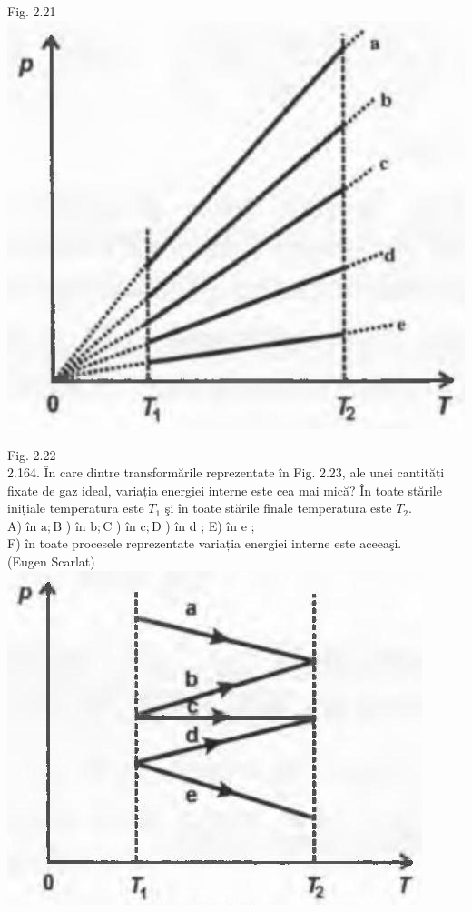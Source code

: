 \documentclass[10pt]{article}
\begin{document}
Fig. 2.21\\
\includegraphics[max width=\textwidth, center]{2025_07_01_5b3ff9fa0d508c8e9f17g-110(2)}

Fig. 2.22\\
2.164. În care dintre transformările reprezentate în Fig. 2.23, ale unei cantități fixate de gaz ideal, variația energiei interne este cea mai mică? În toate stările inițiale temperatura este $T_{1}$ şi în toate stările finale temperatura este $T_{2}$.\\
A) în $\mathrm{a} ; \mathrm{B}$ ) în $\mathrm{b} ; \mathrm{C}$ ) în $\mathrm{c} ; \mathrm{D}$ ) în d ; E) în e ;\\
F) în toate procesele reprezentate variația energiei interne este aceeaşi.\\
(Eugen Scarlat)\\
\includegraphics[max width=\textwidth, center]{2025_07_01_5b3ff9fa0d508c8e9f17g-110}
\end{document}
